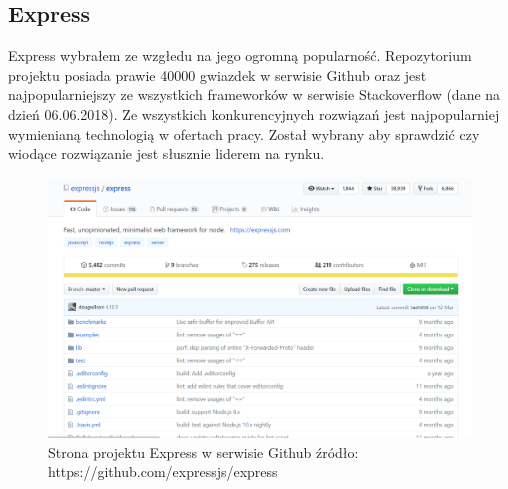 \documentclass[12pt]{report}
\begin{document}
    \subsection{Express}
      Express wybrałem ze wzgłedu na jego ogromną popularność.
      Repozytorium projektu posiada prawie 40000 gwiazdek w serwisie Github oraz jest najpopularniejszy ze wszystkich frameworków w serwisie Stackoverflow (dane na dzień 06.06.2018).
      Ze wszystkich konkurencyjnych rozwiązań jest najpopularniej wymienianą technologią w ofertach pracy.
      Został wybrany aby sprawdzić czy wiodące rozwiązanie jest słusznie liderem na rynku.
      \begin{figure}[!hb]
        \centering
        \includegraphics[width=\textwidth,height=\textheight,keepaspectratio]{express.png} 
        \caption{Strona projektu Express w serwisie Github \newline źródło: https://github.com/expressjs/express}
      \end{figure}
\end{document}
